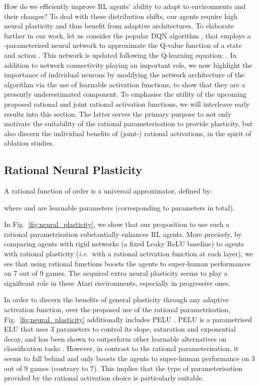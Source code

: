 \documentclass[accepted]{article}
\theoremstyle{plain}
\theoremstyle{definition}
\theoremstyle{remark}
\newcommand{\ie}{\emph{i.e.}~}
\begin{document}
How do we efficiently improve RL agents' ability to adapt to environments and their changes? To deal with these distribution shifts, our agents require high neural plasticity and thus benefit from adaptive architectures. To elaborate further in our work, let us consider the popular DQN algorithm \citep{mnih2015human}, that employs a -parameterised neural network to approximate the Q-value function of a state  and action . This network is updated following the Q-learning equation:
. In addition to network connectivity playing an important role, we now highlight the importance of individual neurons by modifying the network architecture of the algorithm via the use of learnable activation functions, to show that they are a presently underestimated component. To emphasise the utility of the upcoming proposed rational and joint rational activation functions, we will interleave early results into this section. The latter serves the primary purpose to not only motivate the suitability of the rational parameterisation to provide plasticity, but also discern the individual benefits of (joint-) rational activations, in the spirit of ablation studies.

\subsection{Rational Neural Plasticity}
A rational function of order  is a universal approximator, defined by:

where  and  are learnable parameters (corresponding to  parameters in total).

In Fig.~\ref{fig:neural_plasticity}, we show that our proposition to use such a rational parametrisation substantially enhances RL agents. 
More precisely, by comparing agents with rigid networks (a fixed Leaky ReLU baseline) to agents with rational plasticity (\ie with a rational activation function at each layer), we see that using rational functions boosts the agents to super-human performances on 7 out of 9 games. The acquired extra neural plasticity seems to play a significant role in these Atari environments, especially in progressive ones.

In order to discern the benefits of general plasticity through any adaptive activation function, over the proposed use of the rational parametrisation, Fig.~\ref{fig:neural_plasticity} additionally includes PELU \citep{TrottierGC17}. PELU is a parametrised ELU that uses 3 parameters to control its slope, saturation and exponential decay, and has been shown to outperform other learnable alternatives on classification tasks \citep{Godfrey2019AnEO}. However, in contrast to the rational parameterisation, it seems to fall behind and only boosts the agents to super-human performance on 3 out of 9 games (contrary to 7). This implies that the type of parameterisation provided by the rational activation choice is particularly suitable.
\end{document}
